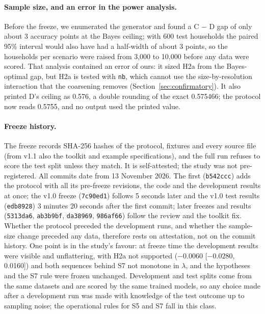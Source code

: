 \documentclass[11pt]{article}
\newcommand{\code}[1]{\texttt{#1}}
\begin{document}
\paragraph{Sample size, and an error in the power analysis.} Before the freeze, we enumerated the generator and found a C $-$ D gap of only about 3 accuracy points at the Bayes ceiling; with 600 test households the paired 95\% interval would also have had a half-width of about 3 points, so the households per scenario were raised from 3,000 to 10,000 before any data were scored. That analysis contained an error of ours: it sized H2a from the Bayes-optimal gap, but H2a is tested with \code{nb}, which cannot use the size-by-resolution interaction that the coarsening removes (Section~\ref{sec:confirmatory}). It also printed D's ceiling as 0.576, a double rounding of the exact 0.575466; the protocol now reads 0.5755, and no output used the printed value.

\paragraph{Freeze history.} The freeze records SHA-256 hashes of the protocol, fixtures and every source file (from v1.1 also the toolkit and example specifications), and the full run refuses to score the test split unless they match. It is self-attested; the study was not pre-registered. All commits date from 13 November 2026. The first (\code{b542ccc}) adds the protocol with all its pre-freeze revisions, the code and the development results at once; the v1.0 freeze (\code{7c90ed1}) follows 5 seconds later and the v1.0 test results (\code{edb8928}) 3 minutes 20 seconds after the first commit; later freezes and results (\code{5313da6}, \code{ab3b9bf}, \code{da38969}, \code{986af66}) follow the review and the toolkit fix. Whether the protocol preceded the development runs, and whether the sample-size change preceded any data, therefore rests on attestation, not on the commit history. One point is in the study's favour: at freeze time the development results were visible and unflattering, with H2a not supported ($-0.0060$ [$-0.0280$, 0.0160]) and both sequences behind S7 not monotone in $\lambda$, and the hypotheses and the S7 rule were frozen unchanged. Development and test splits come from the same datasets and are scored by the same trained models, so any choice made after a development run was made with knowledge of the test outcome up to sampling noise; the operational rules for S5 and S7 fall in this class.
\end{document}
